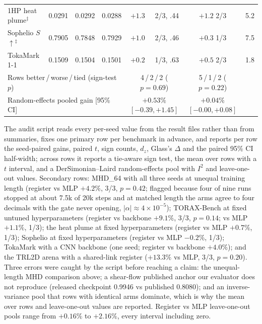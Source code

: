 \documentclass{article}
\newcommand{\AuditQvT}{5\,/\,1\,/\,2}   \newcommand{\AuditQvTp}{0.22}
\newcommand{\AuditQvM}{4\,/\,2\,/\,2}   \newcommand{\AuditQvMp}{0.69}
\newcommand{\AuditREqt}{$+0.04\%$ $[-0.00, +0.08]$}
\newcommand{\AuditREqm}{$+0.53\%$ $[-0.39, +1.45]$}
\begin{document}
\begin{table}[h]
\begin{tabular}{lccccccr}
1HP heat plume$^\ddagger$ & 0.0291 & 0.0292 & 0.0288 & $+1.3$ & 2/3, .44 & $+1.2$ 2/3 & 5.2 \\
Sophelio $S$\,$\uparrow$$^\ddagger$ & 0.7905 & 0.7848 & 0.7929 & $+1.0$ & 2/3, .46 & $+0.3$ 1/3 & 7.5 \\
TokaMark 1-1 & 0.1509 & 0.1504 & 0.1501 & $+0.2$ & 1/3, .63 & $+0.5$ 2/3 & 1.8 \\
\midrule
\multicolumn{4}{l}{Rows better\,/\,worse\,/\,tied (sign-test $p$)} & \multicolumn{2}{c}{\AuditQvM{} ($p{=}\AuditQvMp$)} & \AuditQvT{} ($p{=}\AuditQvTp$) & \\
\multicolumn{4}{l}{Random-effects pooled gain [95\% CI]} & \multicolumn{2}{c}{\AuditREqm} & \AuditREqt & \\
\bottomrule
\end{tabular}
\end{table}
\label{app:audit}

The audit script reads every per-seed value from the result files rather than from summaries, fixes one primary row
per benchmark in advance, and reports per row the seed-paired gains, paired $t$, sign counts, $d_z$, Glass's
$\Delta$ and the paired 95\% CI half-width; across rows it reports a tie-aware sign test, the mean over rows with a
$t$ interval, and a DerSimonian--Laird random-effects pool with $I^2$ and leave-one-out values. Secondary rows:
MHD\_64 with all three seeds at unequal training length (register vs MLP $+4.2\%$, 3/3, $p=0.42$; flagged because four
of nine runs stopped at about 7.5k of 20k steps and at matched length the arms agree to four decimals with the gate
never opening, $|\alpha| \approx 4{\times}10^{-5}$); TORAX-Bench at fixed untuned hyperparameters (register vs backbone
$+9.1\%$, 3/3, $p=0.14$; vs MLP $+1.1\%$, 1/3); the heat plume at fixed hyperparameters (register vs MLP $+0.7\%$, 1/3);
Sophelio at fixed hyperparameters (register vs MLP $-0.2\%$, 1/3); TokaMark with a CNN backbone (one seed; register vs
backbone $+4.0\%$); and the TRL2D arena with a shared-link register ($+13.3\%$ vs MLP, 3/3, $p=0.20$). Three errors were
caught by the script before reaching a claim: the unequal-length MHD comparison above; a shear-flow published anchor
our evaluator does not reproduce (released checkpoint 0.9946 vs published 0.8080); and an inverse-variance pool that
rows with identical arms dominate, which is why the mean over rows and leave-one-out values are reported. Register
vs MLP leave-one-out pools range from $+0.16\%$ to $+2.16\%$, every interval including zero.
\end{document}
